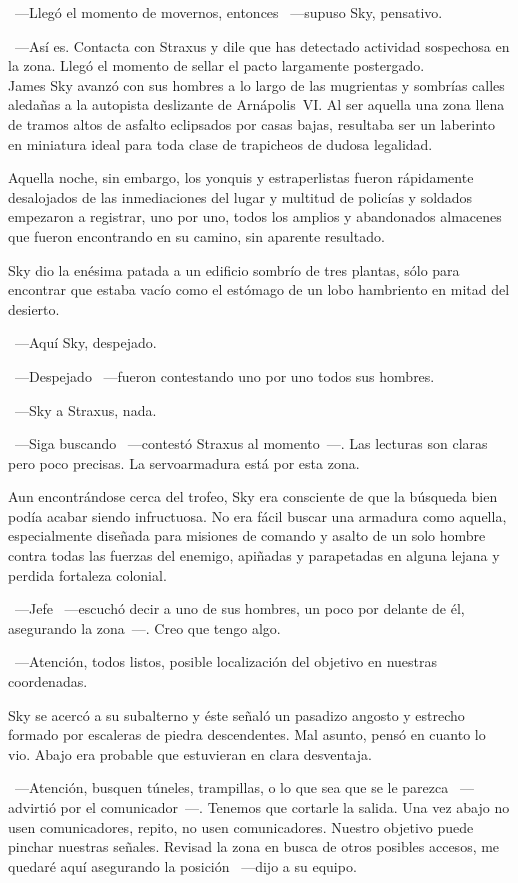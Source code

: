 ~---Llegó el momento de movernos, entonces ~---supuso Sky, pensativo.

~---Así es. Contacta con Straxus y dile que has detectado actividad sospechosa en la zona. Llegó el momento de sellar el pacto largamente postergado.\\

\noindent{}James Sky avanzó con sus hombres a lo largo de las mugrientas y sombrías calles aledañas a la autopista deslizante de Arnápolis~VI. Al ser aquella una zona llena de tramos altos de asfalto eclipsados por casas bajas, resultaba ser un laberinto en miniatura ideal para toda clase de trapicheos de dudosa legalidad.

Aquella noche, sin embargo, los yonquis y estraperlistas fueron rápidamente desalojados de las inmediaciones del lugar y multitud de policías y soldados empezaron a registrar, uno por uno, todos los amplios y abandonados almacenes que fueron encontrando en su camino, sin aparente resultado.

Sky dio la enésima patada a un edificio sombrío de tres plantas, sólo para encontrar que estaba vacío como el estómago de un lobo hambriento en mitad del desierto.

~---Aquí Sky, despejado.

~---Despejado ~---fueron contestando uno por uno todos sus hombres.

~---Sky a Straxus, nada.

~---Siga buscando ~---contestó Straxus al momento~---. Las lecturas son claras pero poco precisas. La servoarmadura está por esta zona.

Aun encontrándose cerca del trofeo, Sky era consciente de que la búsqueda bien podía acabar siendo infructuosa. No era fácil buscar una armadura como aquella, especialmente diseñada para misiones de comando y asalto de un solo hombre contra todas las fuerzas del enemigo, apiñadas y parapetadas en alguna lejana y perdida fortaleza colonial.

~---Jefe ~---escuchó decir a uno de sus hombres, un poco por delante de él, asegurando la zona~---. Creo que tengo algo.

~---Atención, todos listos, posible localización del objetivo en nuestras coordenadas.

Sky se acercó a su subalterno y éste señaló un pasadizo angosto y estrecho formado por escaleras de piedra descendentes. Mal asunto, pensó en cuanto lo vio. Abajo era probable que estuvieran en clara desventaja.

~---Atención, busquen túneles, trampillas, o lo que sea que se le parezca ~---advirtió por el comunicador~---. Tenemos que cortarle la salida. Una vez abajo no usen comunicadores, repito, no usen comunicadores. Nuestro objetivo puede pinchar nuestras señales. Revisad la zona en busca de otros posibles accesos, me quedaré aquí asegurando la posición ~---dijo a su equipo.


